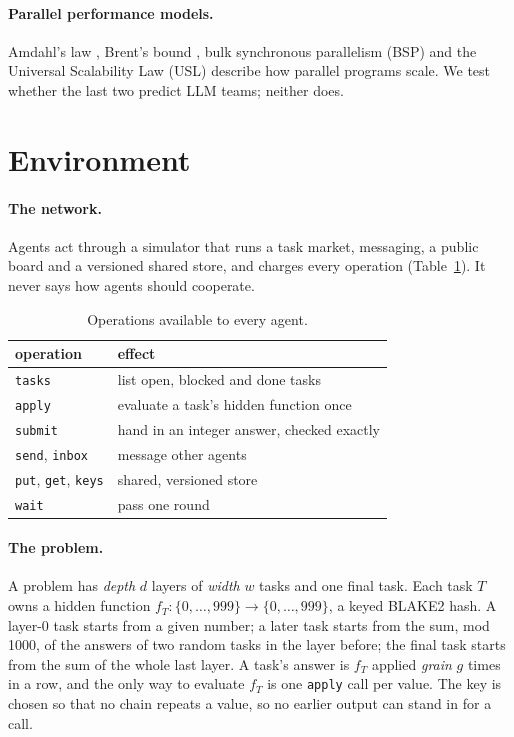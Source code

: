 \documentclass[10pt,twocolumn]{article}
\begin{document}
\paragraph{Parallel performance models.}
Amdahl's law \citep{amdahl1967}, Brent's bound \citep{brent1974,graham1969}, bulk synchronous parallelism (BSP) \citep{valiant1990bsp} and the Universal Scalability Law (USL) \citep{gunther2007usl} describe how parallel programs scale. We test whether the last two predict LLM teams; neither does.

\section{Environment}
\label{sec:env}

\paragraph{The network.}
Agents act through a simulator that runs a task market, messaging, a public board and a versioned shared store, and charges every operation (Table~\ref{tab:ops}). It never says how agents should cooperate.

\begin{table}[t]
\centering\small
\caption{Operations available to every agent.}
\label{tab:ops}
\begin{tabular}{@{}ll@{}}
\toprule
operation & effect \\
\midrule
\texttt{tasks} & list open, blocked and done tasks \\
\texttt{apply} & evaluate a task's hidden function once \\
\texttt{submit} & hand in an integer answer, checked exactly \\
\texttt{send}, \texttt{inbox} & message other agents \\
\texttt{put}, \texttt{get}, \texttt{keys} & shared, versioned store \\
\texttt{wait} & pass one round \\
\bottomrule
\end{tabular}
\end{table}

\paragraph{The problem.}
A problem has \emph{depth} $d$ layers of \emph{width} $w$ tasks and one final task.
Each task $T$ owns a hidden function $f_T:\{0,\dots,999\}\to\{0,\dots,999\}$, a keyed BLAKE2 hash.
A layer-0 task starts from a given number; a later task starts from the sum, mod 1000, of the answers of two random tasks in the layer before; the final task starts from the sum of the whole last layer.
A task's answer is $f_T$ applied \emph{grain} $g$ times in a row, and the only way to evaluate $f_T$ is one \texttt{apply} call per value.
The key is chosen so that no chain repeats a value, so no earlier output can stand in for a call.
\end{document}
